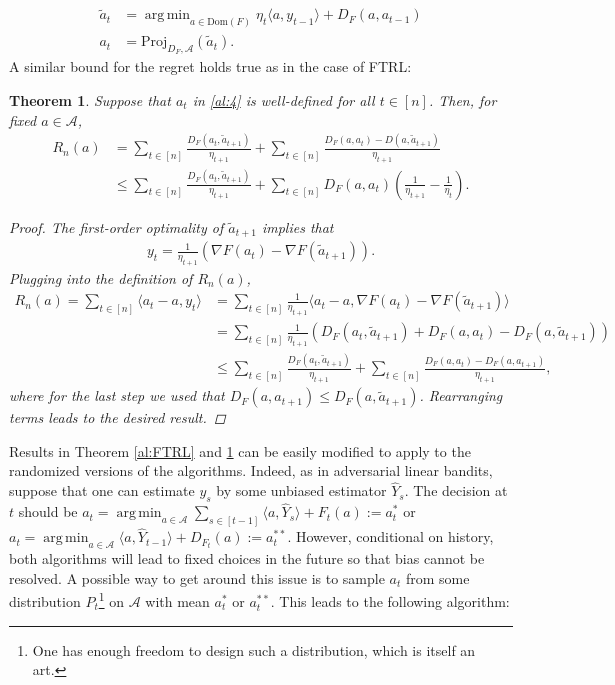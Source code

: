 \documentclass[10pt,a4article]{amsart}
\numberwithin{equation}{section}
\theoremstyle{plain}
\newtheorem{Th}{Theorem}
\theoremstyle{definition}
\DeclareMathOperator*{\argmin}{arg\,min}
\begin{document}
\begin{align*}
\tilde{a}_t &= \argmin_{a\in\text{Dom}(F)}\eta_t\langle a, y_{t-1}\rangle + D_F(a, a_{t-1})\\
a_t &= \text{Proj}_{D_F, \mathcal A}(\tilde{a}_{t}).
\end{align*}
A similar bound for the regret holds true as in the case of FTRL:
\begin{Th}\label{al:MR}
Suppose that $a_t$ in \eqref{al:4} is well-defined for all $t\in [n]$. Then, for fixed $a\in\mathcal A$,  
\begin{align*}
R_n(a)&=\sum_{t\in [n]}\frac{D_F(a_t, \tilde{a}_{t+1})}{\eta_{t+1}}+\sum_{t\in [n]}\frac{D_F(a,a_t)-D(a,\tilde{a}_{t+1})}{\eta_{t+1}}\\
&\leq \sum_{t\in [n]}\frac{D_F(a_t, \tilde{a}_{t+1})}{\eta_{t+1}}+\sum_{t\in [n]}D_F(a,a_t)\left(\frac{1}{\eta_{t+1}}-\frac{1}{\eta_t}\right).
\end{align*}
\begin{proof}
The first-order optimality of $\tilde{a}_{t+1}$ implies that 
\begin{align*}
y_t = \frac{1}{\eta_{t+1}}\left(\nabla F(a_t)-\nabla F(\tilde{a}_{t+1})\right).
\end{align*}
Plugging into the definition of $R_n(a)$, 
\begin{align*}
R_n(a)=\sum_{t\in [n]}\langle a_t-a, y_t\rangle &= \sum_{t\in [n]}\frac{1}{\eta_{t+1}}\langle a_t-a, \nabla F(a_t)-\nabla F(\tilde{a}_{t+1})\rangle\\
& = \sum_{t\in [n]}\frac{1}{\eta_{t+1}}\left(D_F(a_t, \tilde{a}_{t+1})+D_F(a, a_t)-D_F(a, \tilde{a}_{t+1})\right)\\
& \leq \sum_{t\in [n]}\frac{D_F(a_t, \tilde{a}_{t+1})}{\eta_{t+1}}+\sum_{t\in [n]}\frac{D_F(a, a_t)-D_F(a, a_{t+1})}{\eta_{t+1}},
\end{align*}
where for the last step we used that $D_F(a, a_{t+1})\leq D_F(a, \tilde{a}_{t+1})$. Rearranging terms leads to the desired result. 
\end{proof}
\end{Th}
Results in Theorem \ref{al:FTRL} and \ref{al:MR} can be easily modified to apply to the randomized versions of the algorithms. Indeed, as in adversarial linear bandits, suppose that one can estimate $y_s$ by some unbiased estimator $\hat{Y}_{s}$.  The decision at $t$ should be $a_t=\argmin_{a\in\mathcal A}\sum_{s\in [t-1]}\langle a, \hat{Y}_s\rangle+F_t(a):=a_t^*$ or $a_{t}=\argmin_{a\in\mathcal A}\langle a, \hat{Y}_{t-1}\rangle+D_{F_{t}}(a):=a^{**}_t$. However, conditional on history, both algorithms will lead to fixed choices in the future so that bias cannot be resolved. A possible way to get around this issue is to sample $a_t$ from some distribution $P_t$\footnote{One has enough freedom to design such a distribution, which is itself an art.} on $\mathcal A$ with mean $a_t^*$ or $a^{**}_t$. This leads to the following algorithm:
\end{document}
